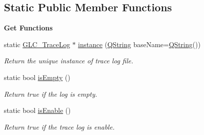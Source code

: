 \subsection*{Static Public Member Functions}
\begin{Indent}{\bf Get Functions}\par
\begin{DoxyCompactItemize}
\item 
static \hyperlink{class_g_l_c___trace_log}{G\-L\-C\-\_\-\-Trace\-Log} $\ast$ \hyperlink{class_g_l_c___trace_log_ac86935efd0a00a49c8936ee42ce5d8cc}{instance} (\hyperlink{group___u_a_v_objects_plugin_gab9d252f49c333c94a72f97ce3105a32d}{Q\-String} base\-Name=\hyperlink{group___u_a_v_objects_plugin_gab9d252f49c333c94a72f97ce3105a32d}{Q\-String}())
\begin{DoxyCompactList}\small\item\em Return the unique instance of trace log file. \end{DoxyCompactList}\item 
static bool \hyperlink{class_g_l_c___trace_log_acc1621d342da8e0b35289b265dfecb01}{is\-Empty} ()
\begin{DoxyCompactList}\small\item\em Return true if the log is empty. \end{DoxyCompactList}\item 
static bool \hyperlink{class_g_l_c___trace_log_a6196dc401c903dba18eaa2211297afd1}{is\-Enable} ()
\begin{DoxyCompactList}\small\item\em Return true if the trace log is enable. \end{DoxyCompactList}\end{DoxyCompactItemize}
\end{Indent}

